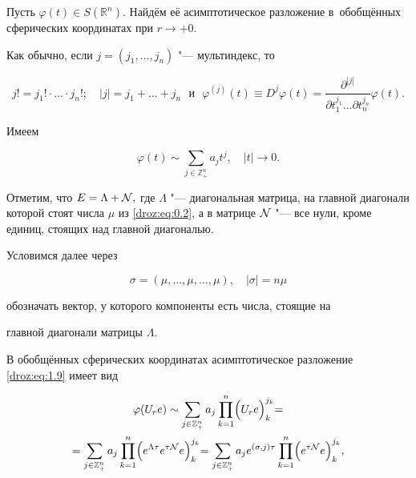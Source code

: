 Пусть $\varphi(t) \in S(\mathbb R^n).$  Найдём её асимптотическое разложение в~обоб\-щённых сферических координатах при $r\to {+0}.$

Как обычно, если $j=(j_1,  \dots,j_n)$ "--- мультиндекс, то

$$j!=j_1!\cdot \dots \cdot j_n!; \quad |j|=j_1+\dots +j_n \text{~~и~~}

\varphi^{(j)}(t) \equiv D^j\varphi(t)=\frac{\partial^{|j|}}{\partial

t_1^{j_1}\dots \partial t_n^{j_n}} \varphi(t).$$

Имеем

\begin{equation}

\label{droz:eq:1.9}

\varphi(t) \sim \sum_{j\in \mathbb Z_{+}^n} a_jt^j,\quad |t|\to 0.

\end{equation}

Отметим, что $E=\Lambda +{\cal N},$ где $\Lambda$ "--- диагональная матрица, на главной диагонали которой стоят числа $\mu$ из \eqref{droz:eq:0.2}, а в матрице $\cal N$ "--- все нули, кроме единиц, стоящих над главной диагональю. 

Условимся далее через 

\begin{equation}

\label{droz:eq:1.10}

\sigma=(\mu,\dots,\mu,\dots,\mu),\quad |\sigma|=n\mu

\end{equation}

обозначать вектор, у которого компоненты есть числа, стоящие на

главной диагонали матрицы $\Lambda.$



В обобщённых сферических координатах асимптотическое разложение \eqref{droz:eq:1.9} имеет вид

\begin{multline}

\label{droz:eq:1.11} 

\varphi(U_re) \sim \sum_{j\in \mathbb Z_{+}^n}a_j \prod_{k=1}^n\Bigr(U_re\Bigl)_k^{j_k}=\\

=\sum_{j\in \mathbb Z_{+}^n}a_j\prod_{k=1}^n\Bigr(e^{\Lambda \tau} e^{\tau

{\cal N}}e\Bigl)_k^{j_k}=\sum_{j\in \mathbb Z_{+}^n}a_je^{(\sigma,j)\tau}

\prod_{k=1}^n\Bigr( e^{\tau{\cal N}}e \Bigl)_k^{j_k},

\end{multline}

